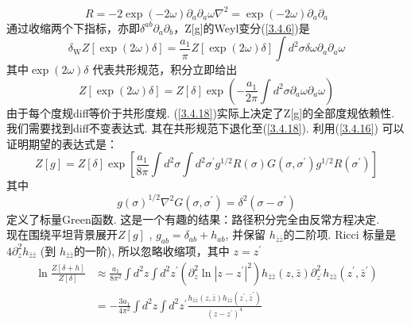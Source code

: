 \begin{subequations}\label{3.4.16}
\begin{equation}
R=-2 \exp (-2 \omega) \partial_{a} \partial_{a} \omega
\end{equation}
\begin{equation}
\nabla^{2}=\exp (-2 \omega) \partial_{a} \partial_{a}
\end{equation}
\end{subequations}
通过收缩两个下指标，亦即$\delta^{a b} \partial_{a} \partial_{b}$，Z[g]的Weyl变分(\ref{3.4.6})是
\begin{equation}
\delta_{\mathrm{W}} Z[\exp (2 \omega) \delta]=\frac{a_{1}}{\pi} Z[\exp (2 \omega) \delta] \int d^{2} \sigma \delta \omega \partial_{a} \partial_{a} \omega
\end{equation}
其中$\exp (2 \omega) \delta$ 代表共形规范，积分立即给出
\begin{equation}\label{3.4.18}
Z[\exp (2 \omega) \delta]=Z[\delta] \exp \left(-\frac{a_{1}}{2 \pi} \int d^{2} \sigma \partial_{a} \omega \partial_{a} \omega\right)
\end{equation}
由于每个度规diff等价于共形度规. (\ref{3.4.18})实际上决定了Z[g]的全部度规依赖性. 我们需要找到diff不变表达式. 其在共形规范下退化至(\ref{3.4.18}). 利用(\ref{3.4.16}) 可以证明期望的表达式是：
\begin{equation}\label{3.4.19}
Z[g]=Z[\delta] \exp \left[\frac{a_{1}}{8 \pi} \int d^{2} \sigma \int d^{2} \sigma^{\prime} g^{1 / 2} R(\sigma) G\left(\sigma, \sigma^{\prime}\right) g^{1 / 2} R\left(\sigma^{\prime}\right)\right]
\end{equation}
其中
\begin{equation}
g(\sigma)^{1 / 2} \nabla^{2} G\left(\sigma, \sigma^{\prime}\right)=\delta^{2}\left(\sigma-\sigma^{\prime}\right)
\end{equation}
定义了标量Green函数. 这是一个有趣的结果：路径积分完全由反常方程决定.\\
现在围绕平坦背景展开$Z[g]$ , $g_{a b}=\delta_{a b}+h_{a b}$, 并保留 $h_{\bar{z} \bar{z}} $的二阶项. Ricci 标量是 $4 \partial_{z}^{2} h_{\bar{z} \bar{z}}$ (到 $h_{\bar{z} \bar{z}}$的一阶), 所以忽略收缩项，其中 $z=z^{\prime}$ 
\begin{equation}\label{3.4.21}
\begin{aligned}
\ln \frac{Z[\delta+h]}{Z[\delta]} & \approx \frac{a_{1}}{8 \pi^{2}} \int d^{2} z \int d^{2} z^{\prime}\left(\partial_{z}^{2} \ln \left|z-z^{\prime}\right|^{2}\right) h_{\bar{z} \bar{z}}(z, \bar{z}) \partial_{z^{\prime}}^{2} h_{\bar{z} \bar{z}}\left(z^{\prime}, \bar{z}^{\prime}\right) \\
&=-\frac{3 a_{1}}{4 \pi^{2}} \int d^{2} z \int d^{2} z^{\prime} \frac{h_{\bar{z} \bar{z}}(z, \bar{z}) h_{\bar{z} \bar{z}}\left(z^{\prime}, \bar{z}^{\prime}\right)}{\left(z-z^{\prime}\right)^{4}}
\end{aligned}
\end{equation}
